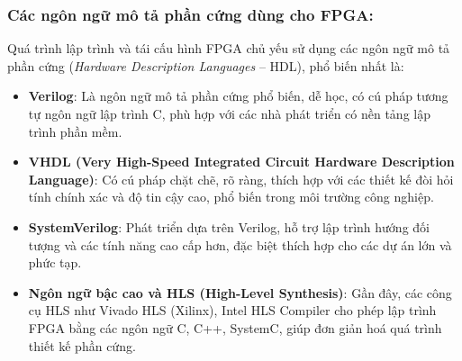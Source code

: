 \documentclass[a4paper]{article}
\begin{document}
\subsubsection{Các ngôn ngữ mô tả phần cứng dùng cho FPGA:}
Quá trình lập trình và tái cấu hình FPGA chủ yếu sử dụng các ngôn ngữ mô tả phần cứng (\textit{Hardware Description Languages} -- HDL), phổ biến nhất là:

\begin{itemize} [label=-]
    \item \textbf{Verilog}: Là ngôn ngữ mô tả phần cứng phổ biến, dễ học, có cú pháp tương tự ngôn ngữ lập trình C, phù hợp với các nhà phát triển có nền tảng lập trình phần mềm.
    \item \textbf{VHDL (Very High-Speed Integrated Circuit Hardware Description Language)}: Có cú pháp chặt chẽ, rõ ràng, thích hợp với các thiết kế đòi hỏi tính chính xác và độ tin cậy cao, phổ biến trong môi trường công nghiệp.
    \item \textbf{SystemVerilog}: Phát triển dựa trên Verilog, hỗ trợ lập trình hướng đối tượng và các tính năng cao cấp hơn, đặc biệt thích hợp cho các dự án lớn và phức tạp.
    \item \textbf{Ngôn ngữ bậc cao và HLS (High-Level Synthesis)}: Gần đây, các công cụ HLS như Vivado HLS (Xilinx), Intel HLS Compiler cho phép lập trình FPGA bằng các ngôn ngữ C, C++, SystemC, giúp đơn giản hoá quá trình thiết kế phần cứng.
\end{itemize}
\end{document}
